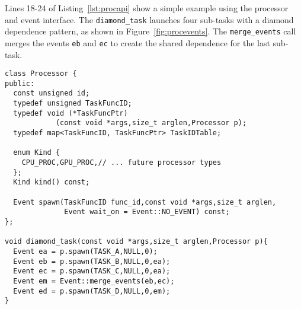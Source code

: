 Lines 18-24 of Listing~\ref{lst:procapi} show a simple example using 
the processor and event interface.  The {\tt diamond\_task} launches four
sub-tasks with a diamond dependence pattern, as shown in Figure~\ref{fig:procevents}.
The {\tt merge\_events} call
merges the events {\tt eb} and {\tt ec} to create the shared dependence
for the last sub-task.

\begin{lstlisting}[float={t},label={lst:procapi},caption={Processor Interface and Example.},belowskip=0pt]
class Processor {
public:
  const unsigned id;
  typedef unsigned TaskFuncID;
  typedef void (*TaskFuncPtr)
            (const void *args,size_t arglen,Processor p);
  typedef map<TaskFuncID, TaskFuncPtr> TaskIDTable;

  enum Kind {
    CPU_PROC,GPU_PROC,// ... future processor types
  };
  Kind kind() const;

  Event spawn(TaskFuncID func_id,const void *args,size_t arglen,
              Event wait_on = Event::NO_EVENT) const;
};

void diamond_task(const void *args,size_t arglen,Processor p){
  Event ea = p.spawn(TASK_A,NULL,0);
  Event eb = p.spawn(TASK_B,NULL,0,ea);
  Event ec = p.spawn(TASK_C,NULL,0,ea);
  Event em = Event::merge_events(eb,ec);
  Event ed = p.spawn(TASK_D,NULL,0,em);
}
\end{lstlisting}

